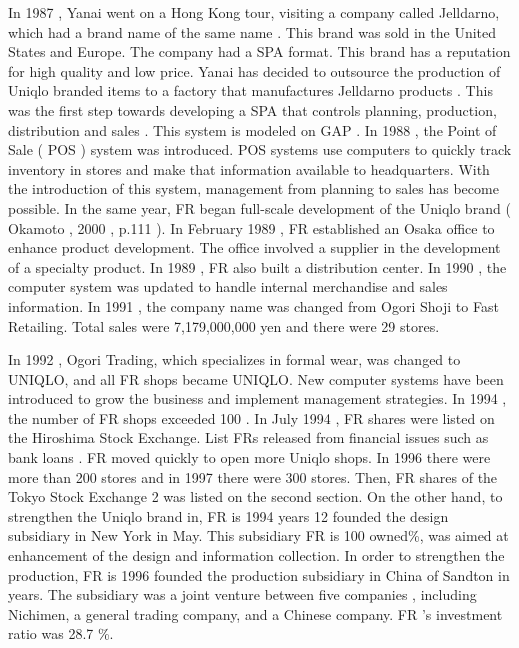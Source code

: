 \documentclass[12pt,]{article}
\begin{document}
In 1987 , Yanai went on a Hong Kong tour, visiting a company called
Jelldarno, which had a brand name of the same name . This brand was sold
in the United States and Europe. The company had a SPA format. This
brand has a reputation for high quality and low price. Yanai has decided
to outsource the production of Uniqlo branded items to a factory that
manufactures Jelldarno products . This was the first step towards
developing a SPA that controls planning, production, distribution and
sales . This system is modeled on GAP . In 1988 , the Point of Sale (
POS ) system was introduced. POS systems use computers to quickly track
inventory in stores and make that information available to headquarters.
With the introduction of this system, management from planning to sales
has become possible. In the same year, FR began full-scale development
of the Uniqlo brand ( Okamoto , 2000 , p.111 ). In February 1989 , FR
established an Osaka office to enhance product development. The office
involved a supplier in the development of a specialty product. In 1989 ,
FR also built a distribution center. In 1990 , the computer system was
updated to handle internal merchandise and sales information. In 1991 ,
the company name was changed from Ogori Shoji to Fast Retailing. Total
sales were 7,179,000,000 yen and there were 29 stores.

In 1992 , Ogori Trading, which specializes in formal wear, was changed
to UNIQLO, and all FR shops became UNIQLO. New computer systems have
been introduced to grow the business and implement management
strategies. In 1994 , the number of FR shops exceeded 100 . In July 1994
, FR shares were listed on the Hiroshima Stock Exchange. List FRs
released from financial issues such as bank loans . FR moved quickly to
open more Uniqlo shops. In 1996 there were more than 200 stores and in
1997 there were 300 stores. Then, FR shares of the Tokyo Stock Exchange
2 was listed on the second section. On the other hand, to strengthen the
Uniqlo brand in, FR is 1994 years 12 founded the design subsidiary in
New York in May. This subsidiary FR is 100 owned\%, was aimed at
enhancement of the design and information collection. In order to
strengthen the production, FR is 1996 founded the production subsidiary
in China of Sandton in years. The subsidiary was a joint venture between
five companies , including Nichimen, a general trading company, and a
Chinese company. FR 's investment ratio was 28.7 \%.
\end{document}
